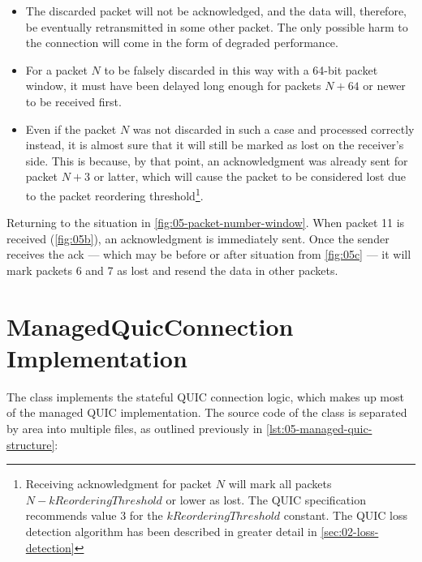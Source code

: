 \begin{itemize}

  \item The discarded packet will not be acknowledged, and the data will, therefore, be eventually
retransmitted in some other packet. The only possible harm to the connection will come in the form
of degraded performance.

  \item For a packet $N$ to be falsely discarded in this way with a 64-bit packet window, it must
have been delayed long enough for packets $N+64$ or newer to be received first.

  \item Even if the packet $N$ was not discarded in such a case and processed correctly instead, it
is almost sure that it will still be marked as lost on the receiver's side. This is because, by that
point, an acknowledgment was already sent for packet $N+3$ or latter, which will cause the packet to
be considered lost due to the packet reordering threshold\footnote{Receiving acknowledgment for
packet $N$ will mark all packets $N - kReorderingThreshold$ or lower as lost. The QUIC specification
recommends value 3 for the $kReorderingThreshold$ constant. The QUIC loss detection algorithm has
been described in greater detail in \autoref{sec:02-loss-detection}}.

\end{itemize}

Returning to the situation in \autoref{fig:05-packet-number-window}. When packet 11 is received
(\autoref{fig:05b}), an acknowledgment is immediately sent. Once the sender receives the ack ---
which may be before or after situation from \autoref{fig:05c} --- it will mark packets 6 and 7 as
lost and resend the data in other packets.

\section{ManagedQuicConnection Implementation}

The \ManagedQuicConnection{} class implements the stateful QUIC connection logic, which makes up
most of the managed QUIC implementation. The source code of the \ManagedQuicConnection{} class is
separated by area into multiple files, as outlined previously in
\autoref{lst:05-managed-quic-structure}:

